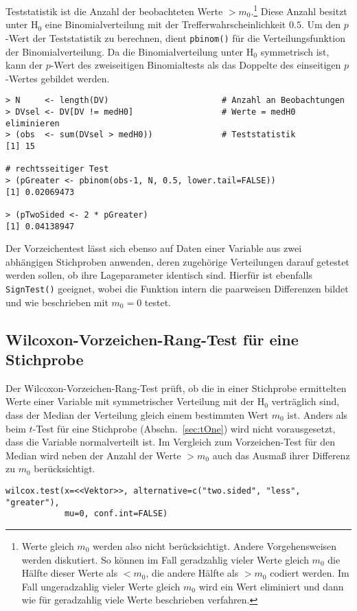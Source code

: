 Teststatistik ist die Anzahl der beobachteten Werte $> m_{0}$.\footnote{Werte gleich $m_{0}$ werden also nicht berücksichtigt. Andere Vorgehensweisen werden diskutiert. So können im Fall geradzahlig vieler Werte gleich $m_{0}$ die Hälfte dieser Werte als $< m_{0}$, die andere Hälfte als $> m_{0}$ codiert werden. Im Fall ungeradzahlig vieler Werte gleich $m_{0}$ wird ein Wert eliminiert und dann wie für geradzahlig viele Werte beschrieben verfahren.} Diese Anzahl besitzt unter $\text{H}_{0}$ eine Binomialverteilung mit der Trefferwahrscheinlichkeit $0.5$. Um den $p$-Wert der Teststatistik zu berechnen, dient \lstinline!pbinom()! für die Verteilungsfunktion der Binomialverteilung. Da die Binomialverteilung unter $\text{H}_{0}$ symmetrisch ist, kann der $p$-Wert des zweiseitigen Binomialtests als das Doppelte des einseitigen $p$-Wertes gebildet werden.
\begin{lstlisting}
> N     <- length(DV)                       # Anzahl an Beobachtungen
> DVsel <- DV[DV != medH0]                  # Werte = medH0 eliminieren
> (obs  <- sum(DVsel > medH0))              # Teststatistik
[1] 15

# rechtsseitiger Test
> (pGreater <- pbinom(obs-1, N, 0.5, lower.tail=FALSE))
[1] 0.02069473

> (pTwoSided <- 2 * pGreater)
[1] 0.04138947
\end{lstlisting}

Der Vorzeichentest lässt sich ebenso auf Daten einer Variable aus zwei abhängigen Stichproben anwenden, deren zugehörige Verteilungen darauf getestet werden sollen, ob ihre Lageparameter identisch sind. Hierfür ist ebenfalls \lstinline!SignTest()! geeignet, wobei die Funktion intern die paarweisen Differenzen bildet und wie beschrieben mit $m_{0}=0$ testet.

\subsection{Wilcoxon-Vorzeichen-Rang-Test für eine Stichprobe}
\label{sec:wilcoxSignRank}

Der Wilcoxon-Vorzeichen-Rang-Test prüft, ob die in einer Stichprobe ermittelten Werte einer Variable mit symmetrischer Verteilung mit der $\text{H}_{0}$ verträglich sind, dass der Median der Verteilung gleich einem bestimmten Wert $m_{0}$ ist. Anders als beim $t$-Test für eine Stichprobe (Abschn.\ \ref{sec:tOne}) wird nicht vorausgesetzt, dass die Variable normalverteilt ist. Im Vergleich zum Vorzeichen-Test für den Median wird neben der Anzahl der Werte $> m_{0}$ auch das Ausmaß ihrer Differenz zu $m_{0}$ berücksichtigt.
\begin{lstlisting}
wilcox.test(x=<<Vektor>>, alternative=c("two.sided", "less", "greater"),
            mu=0, conf.int=FALSE)
\end{lstlisting}

